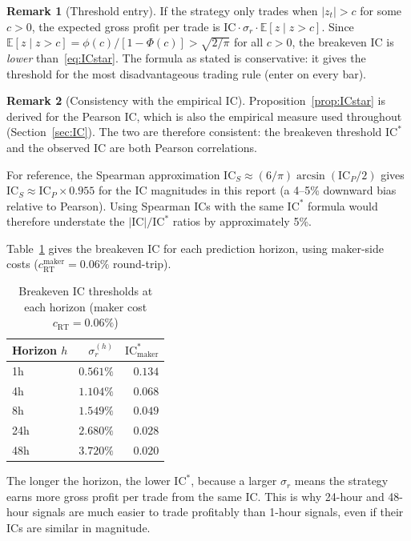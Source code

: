 \documentclass[12pt, a4paper]{article}
\theoremstyle{plain}
\theoremstyle{definition}
\newtheorem{remark}{Remark}[section]
\newcommand{\IC}{\mathrm{IC}}
\newcommand{\E}{\mathbb{E}}
\begin{document}
\begin{remark}[Threshold entry]
  If the strategy only trades when $|z_t| > c$ for some $c > 0$, the expected
  gross profit per trade is $\IC \cdot \sigma_r \cdot \E[z \mid z > c]$. Since
  $\E[z \mid z > c] = \phi(c)/[1-\Phi(c)] > \sqrt{2/\pi}$ for all $c > 0$,
  the breakeven IC is \emph{lower} than~\eqref{eq:ICstar}. The formula
  as stated is conservative: it gives the threshold for the most
  disadvantageous trading rule (enter on every bar).
\end{remark}

\begin{remark}[Consistency with the empirical IC]
  Proposition~\ref{prop:ICstar} is derived for the Pearson IC, which is
  also the empirical measure used throughout (Section~\ref{sec:IC}).
  The two are therefore consistent: the breakeven threshold $\IC^*$ and
  the observed $\IC$ are both Pearson correlations.

  For reference, the Spearman approximation $\IC_S \approx (6/\pi)\arcsin(\IC_P/2)$
  gives $\IC_S \approx \IC_P \times 0.955$ for the IC magnitudes in this report
  (a 4--5\% downward bias relative to Pearson).  Using Spearman ICs with the
  same $\IC^*$ formula would therefore understate the $|\IC|/\IC^*$ ratios
  by approximately 5\%.
\end{remark}

Table~\ref{tab:ICstar} gives the breakeven IC for each prediction horizon,
using maker-side costs ($c_{\text{RT}}^{\text{maker}} = 0.06\%$ round-trip).

\begin{table}[H]
\centering
\caption{Breakeven IC thresholds at each horizon (maker cost $c_{\mathrm{RT}} = 0.06\%$)}
\label{tab:ICstar}
\begin{tabular}{lrr}
\toprule
Horizon $h$ & $\sigma_r^{(h)}$ & $\IC^*_{\mathrm{maker}}$ \\
\midrule
1h   & $0.561\%$ & $0.134$ \\
4h   & $1.104\%$ & $0.068$ \\
8h   & $1.549\%$ & $0.049$ \\
24h  & $2.680\%$ & $0.028$ \\
48h  & $3.720\%$ & $0.020$ \\
\bottomrule
\end{tabular}
\end{table}

The longer the horizon, the lower $\IC^*$, because a larger $\sigma_r$ means
the strategy earns more gross profit per trade from the same IC. This is why
24-hour and 48-hour signals are much easier to trade profitably than
1-hour signals, even if their ICs are similar in magnitude.
\end{document}
